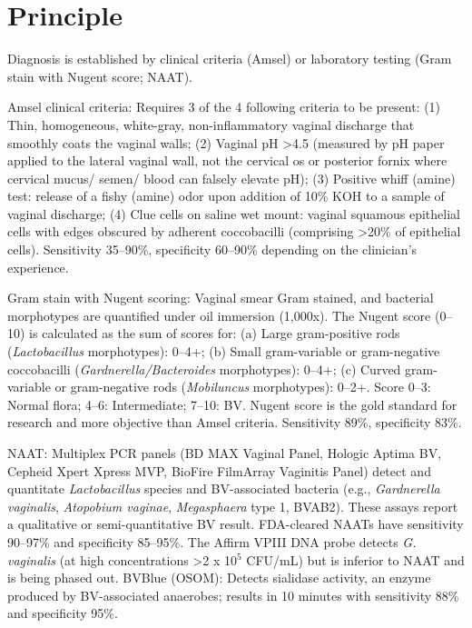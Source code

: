 \section*{Principle}
Diagnosis is established by clinical criteria (Amsel) or laboratory testing (Gram stain with Nugent score; NAAT).

Amsel clinical criteria: Requires 3 of the 4 following criteria to be present: (1) Thin, homogeneous, white-gray, non-inflammatory vaginal discharge that smoothly coats the vaginal walls; (2) Vaginal pH >4.5 (measured by pH paper applied to the lateral vaginal wall, not the cervical os or posterior fornix where cervical mucus/ semen/ blood can falsely elevate pH); (3) Positive whiff (amine) test: release of a fishy (amine) odor upon addition of 10\% KOH to a sample of vaginal discharge; (4) Clue cells on saline wet mount: vaginal squamous epithelial cells with edges obscured by adherent coccobacilli (comprising >20\% of epithelial cells). Sensitivity 35--90\%, specificity 60--90\% depending on the clinician's experience.

Gram stain with Nugent scoring: Vaginal smear Gram stained, and bacterial morphotypes are quantified under oil immersion (1,000x). The Nugent score (0--10) is calculated as the sum of scores for: (a) Large gram-positive rods (\textit{Lactobacillus} morphotypes): 0--4+; (b) Small gram-variable or gram-negative coccobacilli (\textit{Gardnerella/Bacteroides} morphotypes): 0--4+; (c) Curved gram-variable or gram-negative rods (\textit{Mobiluncus} morphotypes): 0--2+. Score 0--3: Normal flora; 4--6: Intermediate; 7--10: BV. Nugent score is the gold standard for research and more objective than Amsel criteria. Sensitivity 89\%, specificity 83\%.

NAAT: Multiplex PCR panels (BD MAX Vaginal Panel, Hologic Aptima BV, Cepheid Xpert Xpress MVP, BioFire FilmArray Vaginitis Panel) detect and quantitate \textit{Lactobacillus} species and BV-associated bacteria (e.g., \textit{Gardnerella vaginalis}, \textit{Atopobium vaginae}, \textit{Megasphaera} type 1, BVAB2). These assays report a qualitative or semi-quantitative BV result. FDA-cleared NAATs have sensitivity 90--97\% and specificity 85--95\%. The Affirm VPIII DNA probe detects \textit{G. vaginalis} (at high concentrations >2 x 10$^5$ CFU/mL) but is inferior to NAAT and is being phased out. BVBlue (OSOM): Detects sialidase activity, an enzyme produced by BV-associated anaerobes; results in 10 minutes with sensitivity 88\% and specificity 95\%.

